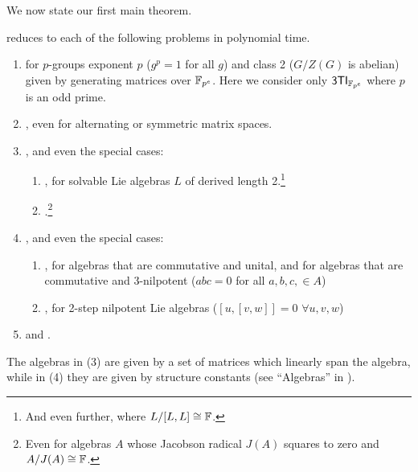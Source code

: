 We now state our first main theorem. 
\begin{maintheorem}\label{thm:main}
\ThreeTIlong reduces to each of the following problems in polynomial time.

\begin{enumerate}
\item \GpIlong for $p$-groups exponent $p$ ($g^p=1$ for all $g$) and class 2 
($G/Z(G)$ is abelian) given by generating matrices over $\mathbb{F}_{p^e}$. Here we consider only $\mathsf{3TI}_{\mathbb{F}_{p^e}}$ where $p$ is 
an odd prime.

\item \label{thm:main:isom} %
\MatSpIsomlong, even for alternating or symmetric matrix spaces.

\item %
\MatSpConjlong, and even the special cases: 
\begin{enumerate}
\item {}, for solvable Lie algebras $L$ of 
derived length 2.\footnote{And even further,  where $L/ [L, L] \cong \mathbb{F}$.} %
\item {}.\footnote{Even for algebras 
$A$ whose Jacobson radical $J(A)$ squares to zero and $A/J(A) \cong \mathbb{F}$.} %
\end{enumerate}

\item %
, and even the special cases:
\begin{enumerate}
\item {}, for algebras that are 
commutative and unital, and for algebras that are commutative and 3-nilpotent 
($abc=0$ for all $a,b,c, \in A$)
\item {}, for 2-step nilpotent Lie algebras ($[u,[v,w]] = 0$ $\forall u,v,w$) %
\end{enumerate}
\item %
\CubicFormlong and \NcCubicFormlong.
\end{enumerate}
The algebras in (3) are given by a set of matrices which linearly span the 
algebra, while in (4) they are given by structure constants (see ``Algebras'' in 
).
\end{maintheorem}

